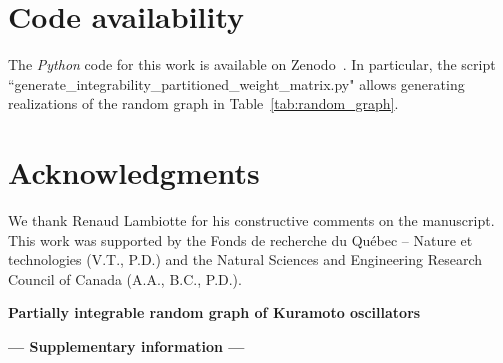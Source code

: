 \documentclass[aps,pre,reprint,longbibliography,superscriptaddress,noshowpacs,floatfix]{revtex4-2}
\theoremstyle{definition}
\theoremstyle{remark}
\begin{document}
\section*{Code availability}

The \textit{Python} code for this work is available on Zenodo~\cite{Thibeault2026_koopman_kuramoto}. In particular, the script ``generate\_integrability\_partitioned\_weight\_matrix.py" allows generating realizations of the random graph in Table~\ref{tab:random_graph}.


\section*{Acknowledgments}

We thank Renaud Lambiotte for his constructive comments on the manuscript. This work was supported by the Fonds de recherche du Qu\'ebec -- Nature et technologies (V.T., P.D.) and the Natural Sciences and Engineering Research Council of Canada (A.A., B.C., P.D.).






\clearpage


\setcounter{equation}{0}
\setcounter{figure}{0}
\setcounter{section}{0}
\setcounter{page}{1}
\setcounter{theorem}{0}
\setcounter{table}{0}

\renewcommand{\theequation}{S\arabic{equation}}
\renewcommand{\thefigure}{S\arabic{figure}}
\renewcommand{\thetable}{S\Roman{table}}
\renewcommand{\thetheorem}{S\arabic{theorem}}
\renewcommand{\thelemma}{S\arabic{lemma}}
\renewcommand{\theHfigure}{Supplement.\thefigure}  %
\renewcommand{\thesection}{S\Roman{section}}
\thispagestyle{empty}


\onecolumngrid


\let\addcontentsline\oldaddcontentsline %

\centerline{\large\textbf{Partially integrable random graph of Kuramoto oscillators}}

\vspace{0.1cm}

\centerline{\textbf{--- Supplementary information ---}}
\end{document}
